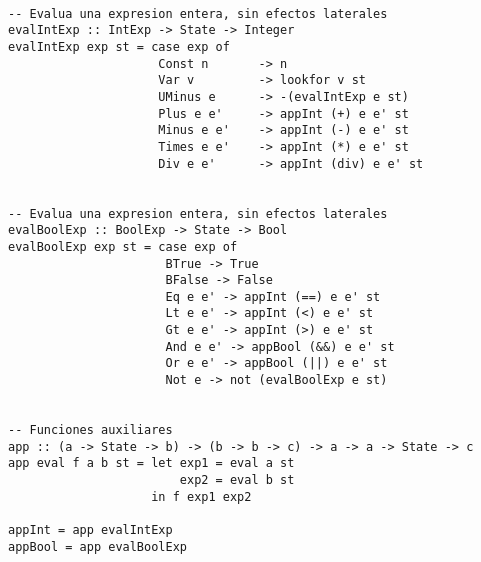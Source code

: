 \documentclass[12pt,a4paper]{article}
\begin{document}
\begin{verbatim}

-- Evalua una expresion entera, sin efectos laterales
evalIntExp :: IntExp -> State -> Integer
evalIntExp exp st = case exp of
                     Const n       -> n
                     Var v         -> lookfor v st
                     UMinus e      -> -(evalIntExp e st)
                     Plus e e'     -> appInt (+) e e' st
                     Minus e e'    -> appInt (-) e e' st
                     Times e e'    -> appInt (*) e e' st
                     Div e e'      -> appInt (div) e e' st


-- Evalua una expresion entera, sin efectos laterales
evalBoolExp :: BoolExp -> State -> Bool
evalBoolExp exp st = case exp of
                      BTrue -> True
                      BFalse -> False
                      Eq e e' -> appInt (==) e e' st
                      Lt e e' -> appInt (<) e e' st
                      Gt e e' -> appInt (>) e e' st
                      And e e' -> appBool (&&) e e' st
                      Or e e' -> appBool (||) e e' st
                      Not e -> not (evalBoolExp e st)


-- Funciones auxiliares
app :: (a -> State -> b) -> (b -> b -> c) -> a -> a -> State -> c
app eval f a b st = let exp1 = eval a st
                        exp2 = eval b st
                    in f exp1 exp2

appInt = app evalIntExp
appBool = app evalBoolExp
\end{verbatim}

\bigskip
\end{document}
